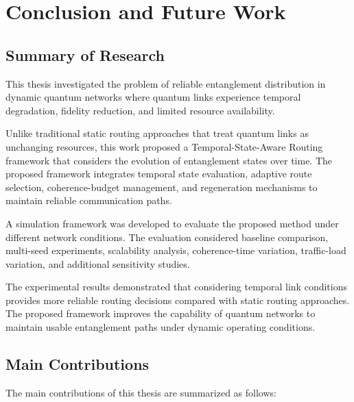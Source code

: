 \chapter{Conclusion and Future Work}

\section{Summary of Research}

This thesis investigated the problem of reliable entanglement distribution
in dynamic quantum networks where quantum links experience temporal
degradation, fidelity reduction, and limited resource availability.

Unlike traditional static routing approaches that treat quantum links as
unchanging resources, this work proposed a Temporal-State-Aware Routing
framework that considers the evolution of entanglement states over time.
The proposed framework integrates temporal state evaluation, adaptive route
selection, coherence-budget management, and regeneration mechanisms to
maintain reliable communication paths.

A simulation framework was developed to evaluate the proposed method under
different network conditions. The evaluation considered baseline comparison,
multi-seed experiments, scalability analysis, coherence-time variation,
traffic-load variation, and additional sensitivity studies.

The experimental results demonstrated that considering temporal link
conditions provides more reliable routing decisions compared with static
routing approaches. The proposed framework improves the capability of quantum
networks to maintain usable entanglement paths under dynamic operating
conditions.


\section{Main Contributions}

The main contributions of this thesis are summarized as follows:

